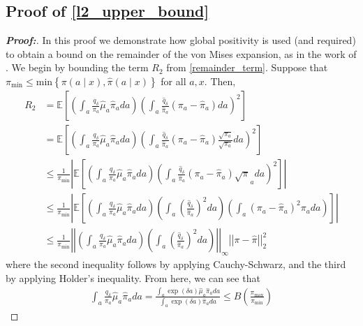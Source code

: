 \documentclass[11pt,twoside]{article}
\theoremstyle{definition}
\theoremstyle{remark}
\begin{document}
\subsection{Proof of \texorpdfstring{\cref{l2_upper_bound}}{Equation (2)}} \label{l2_upper_bound_proof}
\begin{proof}[\textbf{Proof:}]
In this proof we demonstrate how global positivity is used (and required) to obtain a bound on the remainder of the von Mises expansion, as in the work of \cite{diaz2020causal}. We begin by bounding the term $R_2$ from \cref{remainder_term}. Suppose that $\pi_{\min} \leq \text{min}\left\{\pi(a \mid x), \widehat{\pi}(a \mid x) \right\}$ for all $a, x$. Then,
\begin{align*}
    R_2 &= \mathbb{E} \left[\left(\int_a \frac{q_\delta}{\pi_a} \widehat{\mu}_a\widehat{\pi}_a da \right)\left(\int_a \frac{\widehat{q}_\delta}{\widehat{\pi}_a} (\pi_a - \widehat{\pi}_a) da \right)^2\right] \\
    &= \mathbb{E} \left[\left(\int_a \frac{q_\delta}{\pi_a} \widehat{\mu}_a\widehat{\pi}_a da \right)\left(\int_a \frac{\widehat{q}_\delta}{\widehat{\pi}_a} (\pi_a - \widehat{\pi}_a) \frac{\sqrt{\pi_a}}{\sqrt{\pi_a} } da \right)^2\right] \\
    &\leq \frac{1}{\pi_{\min}} \left| \mathbb{E} \left[\left(\int_a \frac{q_\delta}{\pi_a} \widehat{\mu}_a\widehat{\pi}_a da \right)\left(\int_a \frac{\widehat{q}_\delta}{\widehat{\pi}_a} (\pi_a - \widehat{\pi}_a) \sqrt{\pi}_a da \right)^2\right] \right| \\
    &\leq \frac{1}{\pi_{\min}} \left| \mathbb{E} \left[\left(\int_a \frac{q_\delta}{\pi_a} \widehat{\mu}_a\widehat{\pi}_a da \right)\left(\int_a \left(\frac{\widehat{q}_\delta}{\widehat{\pi}_a}\right)^2  da \right) \left( \int_a (\pi_a - \widehat{\pi}_a)^2 \pi_a da \right)\right] \right| \\
    &\leq \frac{1}{\pi_{\min}} \left| \left| \left(\int_a \frac{q_\delta}{\pi_a} \widehat{\mu}_a\widehat{\pi}_a da \right)\left(\int_a \left(\frac{\widehat{q}_\delta}{\widehat{\pi}_a}\right)^2  da \right) \right| \right|_\infty \left| \left|\pi - \widehat{\pi} \right| \right|^2_2
\end{align*}
where the second inequality follows by applying Cauchy-Schwarz, and the third by applying Holder's inequality. From here, we can see that
\begin{align*}
    \int_a \frac{q_\delta}{\pi_a} \widehat{\mu}_a\widehat{\pi}_a da = \frac{\int_a \exp(\delta a) \widehat{\mu}_a \widehat{\pi}_a da }{\int_a \exp(\delta a) \widehat{\pi}_a da } \leq B\left(\frac{\pi_{\max}}{\pi_{\min}} \right) 

\end{align*}
\end{proof}
\end{document}
